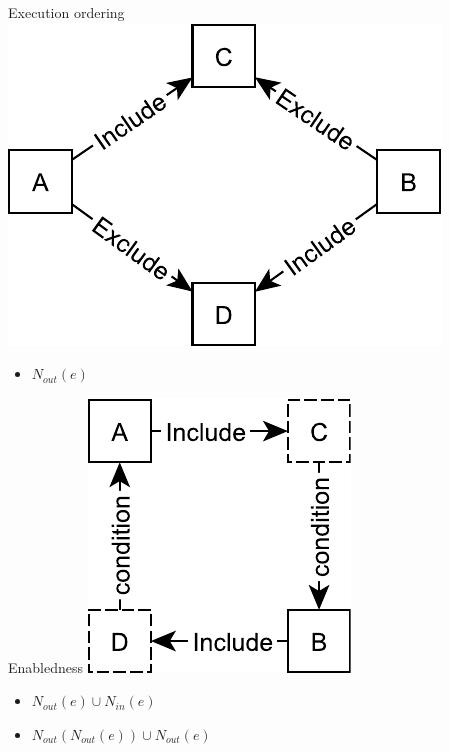 \documentclass{beamer}
\begin{document}
\begin{frame}{Execution ordering}%
	\centering
    \includegraphics[scale=0.5]{figures/race-condition.pdf}
    \vspace{\fill}
    \begin{itemize}
    	\item $N_{out}(e)$
    \end{itemize}
\end{frame}

\begin{frame}{Enabledness}%
	\centering
    \includegraphics[scale=0.5]{figures/second-degree-effect.pdf}
    \vspace{\fill}
    \begin{itemize}
    	\item $N_{out}(e) \cup N_{in}(e)$
    	\item $N_{out}(N_{out}(e)) \cup N_{out}(e)$
    \end{itemize}
\end{frame}
\end{document}
